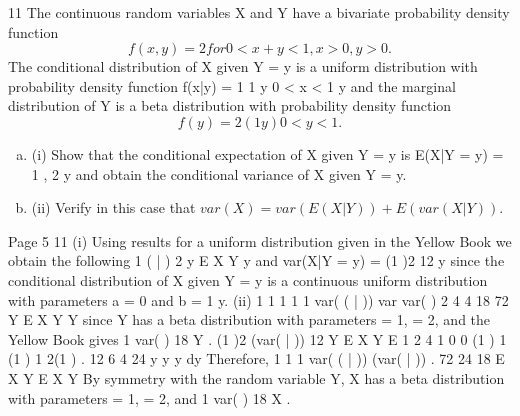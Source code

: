 \documentclass[a4paper,12pt]{article}
\begin{document}
\item 11 The continuous random variables X and Y have a bivariate probability density
function
\[f(x, y) = 2 for 0 < x + y < 1, x > 0, y > 0.\]
The conditional distribution of X given Y = y is a uniform distribution with probability
density function
f(x|y) =
1
1 y
0 < x < 1 y
and the marginal distribution of Y is a beta distribution with probability density
function
\[ f(y) = 2(1 y) 0 < y < 1.\]
\begin{enumerate}[(a)]
\item (i) Show that the conditional expectation of X given Y = y is
E(X|Y = y) =
1
,
2
y
and obtain the conditional variance of X given Y = y. 
\item (ii) Verify in this case that $var(X) = var(E(X|Y)) + E(var(X|Y))$. 
\end{enumerate}

Page 5
11 (i) Using results for a uniform distribution given in the Yellow Book we obtain
the following
1
( | )
2
y
E X Y y
and
var(X|Y = y) =
(1 )2
12
y
since the conditional distribution of X given Y = y is a continuous uniform
distribution with parameters a = 0 and b = 1 y.
(ii)
1 1 1 1 1
var( ( | )) var var( )
2 4 4 18 72
Y
E X Y Y
since Y has a beta distribution with parameters = 1, = 2, and the Yellow
Book gives
1
var( )
18
Y .
(1 )2
(var( | ))
12
Y
E X Y E
1 2 4 1
0 0
(1 ) 1 (1 ) 1
2(1 ) .
12 6 4 24
y y
y dy
Therefore,
1 1 1
var( ( | )) (var( | )) .
72 24 18
E X Y E X Y
By symmetry with the random variable Y, X has a beta distribution with
parameters = 1, = 2, and
1
var( )
18
X .

\end{document}
